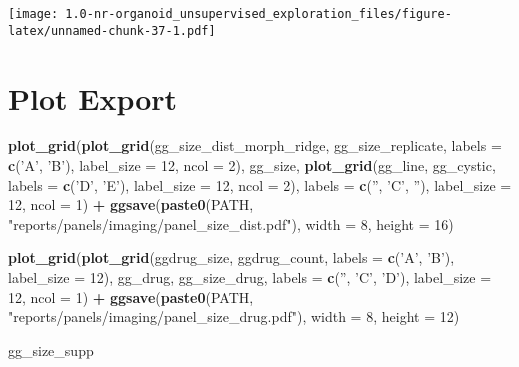\documentclass[
]{article}
\newenvironment{Shaded}{\begin{snugshade}}{\end{snugshade}}
\newcommand{\DataTypeTok}[1]{\textcolor[rgb]{0.13,0.29,0.53}{#1}}
\newcommand{\DecValTok}[1]{\textcolor[rgb]{0.00,0.00,0.81}{#1}}
\newcommand{\KeywordTok}[1]{\textcolor[rgb]{0.13,0.29,0.53}{\textbf{#1}}}
\newcommand{\NormalTok}[1]{#1}
\newcommand{\OperatorTok}[1]{\textcolor[rgb]{0.81,0.36,0.00}{\textbf{#1}}}
\newcommand{\StringTok}[1]{\textcolor[rgb]{0.31,0.60,0.02}{#1}}
\begin{document}
\texttt{[image: 1.0-nr-organoid\_unsupervised\_exploration\_files/figure-latex/unnamed-chunk-37-1.pdf]}

\hypertarget{plot-export}{%
\section{Plot Export}\label{plot-export}}

\begin{Shaded}
\begin{Highlighting}[]
\KeywordTok{plot_grid}\NormalTok{(}\KeywordTok{plot_grid}\NormalTok{(gg_size_dist_morph_ridge, gg_size_replicate, }\DataTypeTok{labels =} \KeywordTok{c}\NormalTok{(}\StringTok{'A'}\NormalTok{, }\StringTok{'B'}\NormalTok{), }\DataTypeTok{label_size =} \DecValTok{12}\NormalTok{, }\DataTypeTok{ncol =} \DecValTok{2}\NormalTok{),}
\NormalTok{          gg_size,}
          \KeywordTok{plot_grid}\NormalTok{(gg_line, gg_cystic, }\DataTypeTok{labels =} \KeywordTok{c}\NormalTok{(}\StringTok{'D'}\NormalTok{, }\StringTok{'E'}\NormalTok{), }\DataTypeTok{label_size =} \DecValTok{12}\NormalTok{, }\DataTypeTok{ncol =} \DecValTok{2}\NormalTok{),}
          \DataTypeTok{labels =} \KeywordTok{c}\NormalTok{(}\StringTok{''}\NormalTok{, }\StringTok{'C'}\NormalTok{, }\StringTok{''}\NormalTok{), }\DataTypeTok{label_size =} \DecValTok{12}\NormalTok{, }\DataTypeTok{ncol =} \DecValTok{1}\NormalTok{) }\OperatorTok{+}
\StringTok{  }\KeywordTok{ggsave}\NormalTok{(}\KeywordTok{paste0}\NormalTok{(PATH, }\StringTok{"reports/panels/imaging/panel_size_dist.pdf"}\NormalTok{), }\DataTypeTok{width =} \DecValTok{8}\NormalTok{, }\DataTypeTok{height =} \DecValTok{16}\NormalTok{)}

\KeywordTok{plot_grid}\NormalTok{(}\KeywordTok{plot_grid}\NormalTok{(ggdrug_size, ggdrug_count, }\DataTypeTok{labels =} \KeywordTok{c}\NormalTok{(}\StringTok{'A'}\NormalTok{, }\StringTok{'B'}\NormalTok{), }\DataTypeTok{label_size =} \DecValTok{12}\NormalTok{),}
\NormalTok{          gg_drug,}
\NormalTok{          gg_size_drug,}
          \DataTypeTok{labels =} \KeywordTok{c}\NormalTok{(}\StringTok{''}\NormalTok{, }\StringTok{'C'}\NormalTok{, }\StringTok{'D'}\NormalTok{), }\DataTypeTok{label_size =} \DecValTok{12}\NormalTok{, }\DataTypeTok{ncol =} \DecValTok{1}\NormalTok{) }\OperatorTok{+}
\StringTok{  }\KeywordTok{ggsave}\NormalTok{(}\KeywordTok{paste0}\NormalTok{(PATH, }\StringTok{"reports/panels/imaging/panel_size_drug.pdf"}\NormalTok{), }\DataTypeTok{width =} \DecValTok{8}\NormalTok{, }\DataTypeTok{height =} \DecValTok{12}\NormalTok{)}

\NormalTok{gg_size_supp}
\end{Highlighting}
\end{Shaded}
\end{document}
